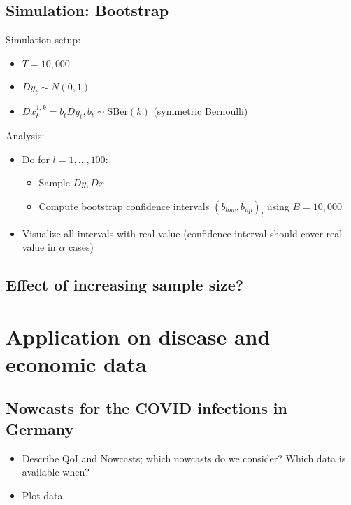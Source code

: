 \documentclass[oneside]{article}
\theoremstyle{plain}%
\theoremstyle{definition}
\newcommand{\ydiff}{D y}
\newcommand{\xdiff}{Dx}
\newcommand{\SBer}{\text{SBer}}
\begin{document}
\subsection{Simulation: Bootstrap}

Simulation setup:

\begin{itemize}
  \item $T = 10,000$
  \item $\ydiff_t \sim N(0, 1)$ 
  \item $\xdiff_t^{1, k} = b_t  \ydiff_t, b_t \sim \SBer(k)$ (symmetric Bernoulli)
\end{itemize}

Analysis:
\begin{itemize}
\item Do for $l = 1, \dots, 100$:
\begin{itemize}
  \item Sample $\ydiff, \xdiff$
  \item Compute bootstrap confidence intervals $(b_{low}, b_{up})_l$ using $B = 10,000$
\end{itemize}
  \item Visualize all intervals with real value (confidence interval should cover real value in $\alpha$ cases)
\end{itemize}



\subsection{Effect of increasing sample size?}

\section{Application on disease and economic data}

\subsection{Nowcasts for the COVID infections in Germany}

\begin{itemize}
  \item Describe QoI and Nowcasts; which nowcasts do we consider? Which data is available when?
  \item Plot data
\end{itemize}
\end{document}
